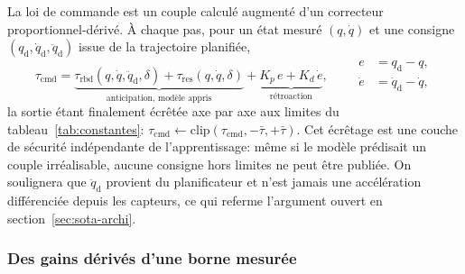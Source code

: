 \documentclass[a4paper, oneside]{article}
\newcommand{\q}{\ensuremath{q}}
\newcommand{\qd}{\ensuremath{\dot{q}}}
\newcommand{\qdd}{\ensuremath{\ddot{q}}}
\newcommand{\taurbd}{\ensuremath{\tau_{\mathrm{rbd}}}}
\newcommand{\taures}{\ensuremath{\tau_{\mathrm{res}}}}
\newcommand{\taucmd}{\ensuremath{\tau_{\mathrm{cmd}}}}
\begin{document}
La loi de commande est un couple calculé augmenté d'un correcteur
proportionnel-dérivé. À chaque pas, pour un état mesuré $(\q,\qd)$ et une
consigne $(\q_{\mathrm{d}},\qd_{\mathrm{d}},\qdd_{\mathrm{d}})$ issue de la
trajectoire planifiée,
%
\begin{equation}
    \taucmd = \underbrace{\taurbd(\q,\qd,\qdd_{\mathrm{d}},\delta)
    + \taures(\q,\qd,\delta)}_{\text{anticipation, modèle appris}}
    + \underbrace{K_p\,e + K_d\,\dot{e}}_{\text{rétroaction}},
    \qquad
    \begin{aligned}
        e &= \q_{\mathrm{d}} - \q, \\
        \dot{e} &= \qd_{\mathrm{d}} - \qd,
    \end{aligned}
    \label{eq:ctpd}
\end{equation}
%
la sortie étant finalement écrêtée axe par axe aux limites du
tableau~\ref{tab:constantes}:
$\taucmd \leftarrow \mathrm{clip}(\taucmd, -\bar{\tau}, +\bar{\tau})$. Cet
écrêtage est une couche de sécurité indépendante de l'apprentissage: même si le
modèle prédisait un couple irréalisable, aucune consigne hors limites ne peut
être publiée. On soulignera que $\qdd_{\mathrm{d}}$ provient du planificateur et
n'est jamais une accélération différenciée depuis les capteurs, ce qui referme
l'argument ouvert en section~\ref{sec:sota-archi}.

\subsubsection{Des gains dérivés d'une borne mesurée}
\label{sec:gains}
\end{document}
